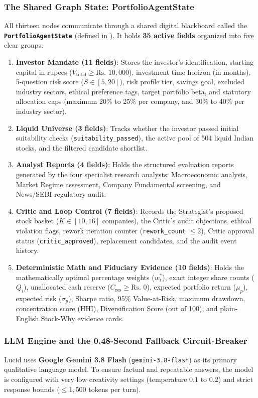 \subsubsection{The Shared Graph State: PortfolioAgentState}
All thirteen nodes communicate through a shared digital blackboard called the \textbf{\texttt{PortfolioAgentState}} (defined in ). It holds \textbf{35 active fields} organized into five clear groups:
\begin{enumerate}
    \item \textbf{Investor Mandate (11 fields)}: Stores the investor's identification, starting capital in rupees ($V_{\text{total}} \ge \text{Rs.~}10,000$), investment time horizon (in months), 5-question risk score ($S \in [5, 20]$), risk profile tier, savings goal, excluded industry sectors, ethical preference tags, target portfolio beta, and statutory allocation caps (maximum 20\% to 25\% per company, and 30\% to 40\% per industry sector).
    \item \textbf{Liquid Universe (3 fields)}: Tracks whether the investor passed initial suitability checks (\texttt{suitability\_passed}), the active pool of 504 liquid Indian stocks, and the filtered candidate shortlist.
    \item \textbf{Analyst Reports (4 fields)}: Holds the structured evaluation reports generated by the four specialist research analysts: Macroeconomic analysis, Market Regime assessment, Company Fundamental screening, and News/SEBI regulatory audit.
    \item \textbf{Critic and Loop Control (7 fields)}: Records the Strategist's proposed stock basket ($K \in [10, 16]$ companies), the Critic's audit objections, ethical violation flags, rework iteration counter (\texttt{rework\_count} $\le 2$), Critic approval status (\texttt{critic\_approved}), replacement candidates, and the audit event history.
    \item \textbf{Deterministic Math and Fiduciary Evidence (10 fields)}: Holds the mathematically optimal percentage weights ($w_i^*$), exact integer share counts ($Q_i$), unallocated cash reserve ($C_{\text{res}} \ge \text{Rs.~}0$), expected portfolio return ($\mu_p$), expected risk ($\sigma_p$), Sharpe ratio, 95\% Value-at-Risk, maximum drawdown, concentration score (HHI), Diversification Score (out of 100), and plain-English Stock-Why evidence cards.
\end{enumerate}

\subsubsection{LLM Engine and the 0.48-Second Fallback Circuit-Breaker}
Lucid uses \textbf{Google Gemini 3.8 Flash} (\texttt{gemini-3.8-flash}) as its primary qualitative language model. To ensure factual and repeatable answers, the model is configured with very low creativity settings (temperature $0.1$ to $0.2$) and strict response bounds ($\le 1,500$ tokens per turn).

